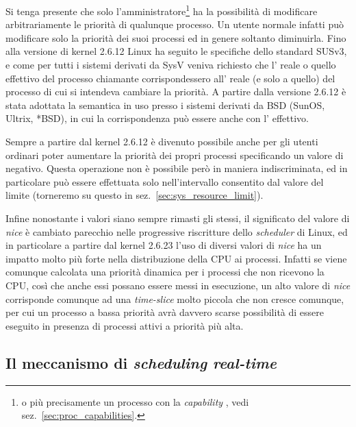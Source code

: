 Si tenga presente che solo l'amministratore\footnote{o più precisamente un
  processo con la \textit{capability} , vedi
  sez.~\ref{sec:proc_capabilities}.} ha la possibilità di modificare
arbitrariamente le priorità di qualunque processo. Un utente normale infatti
può modificare solo la priorità dei suoi processi ed in genere soltanto
diminuirla.  Fino alla versione di kernel 2.6.12 Linux ha seguito le
specifiche dello standard SUSv3, e come per tutti i sistemi derivati da SysV
veniva richiesto che l' reale o quello effettivo del processo
chiamante corrispondessero all' reale (e solo a quello) del processo
di cui si intendeva cambiare la priorità. A partire dalla versione 2.6.12 è
stata adottata la semantica in uso presso i sistemi derivati da BSD (SunOS,
Ultrix, *BSD), in cui la corrispondenza può essere anche con l'
effettivo.

Sempre a partire dal kernel 2.6.12 è divenuto possibile anche per gli utenti
ordinari poter aumentare la priorità dei propri processi specificando un
valore di  negativo. Questa operazione non è possibile però in
maniera indiscriminata, ed in particolare può essere effettuata solo
nell'intervallo consentito dal valore del limite 
(torneremo su questo in sez.~\ref{sec:sys_resource_limit}).

Infine nonostante i valori siano sempre rimasti gli stessi, il significato del
valore di \textit{nice} è cambiato parecchio nelle progressive riscritture
dello \textit{scheduler} di Linux, ed in particolare a partire dal kernel
2.6.23 l'uso di diversi valori di \textit{nice} ha un impatto molto più forte
nella distribuzione della CPU ai processi. Infatti se viene comunque calcolata
una priorità dinamica per i processi che non ricevono la CPU, così che anche
essi possano essere messi in esecuzione, un alto valore di \textit{nice}
corrisponde comunque ad una \textit{time-slice} molto piccola che non cresce
comunque, per cui un processo a bassa priorità avrà davvero scarse possibilità
di essere eseguito in presenza di processi attivi a priorità più alta.


\subsection{Il meccanismo di \textit{scheduling real-time}}
\label{sec:proc_real_time}

